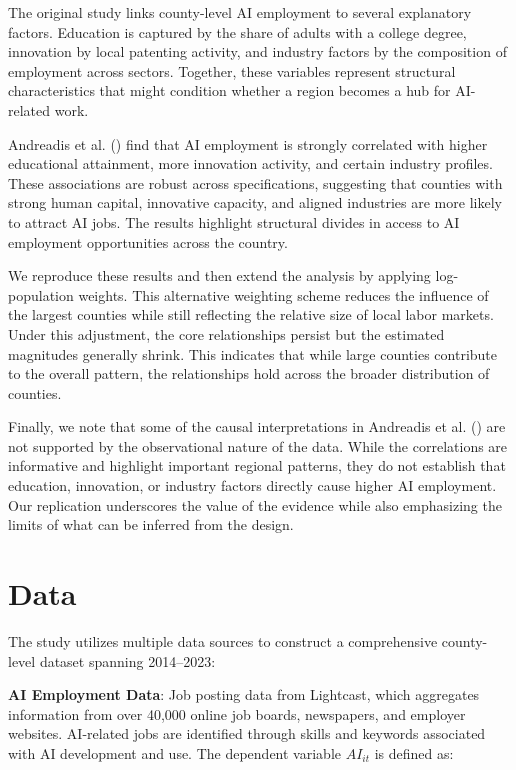\documentclass[
]{article}
\begin{document}
The original study links county-level AI employment to several
explanatory factors. Education is captured by the share of adults with a
college degree, innovation by local patenting activity, and industry
factors by the composition of employment across sectors. Together, these
variables represent structural characteristics that might condition
whether a region becomes a hub for AI-related work.

Andreadis et al. () find that AI
employment is strongly correlated with higher educational attainment,
more innovation activity, and certain industry profiles. These
associations are robust across specifications, suggesting that counties
with strong human capital, innovative capacity, and aligned industries
are more likely to attract AI jobs. The results highlight structural
divides in access to AI employment opportunities across the country.

We reproduce these results and then extend the analysis by applying
log-population weights. This alternative weighting scheme reduces the
influence of the largest counties while still reflecting the relative
size of local labor markets. Under this adjustment, the core
relationships persist but the estimated magnitudes generally shrink.
This indicates that while large counties contribute to the overall
pattern, the relationships hold across the broader distribution of
counties.

Finally, we note that some of the causal interpretations in Andreadis et
al. () are not supported by the
observational nature of the data. While the correlations are informative
and highlight important regional patterns, they do not establish that
education, innovation, or industry factors directly cause higher AI
employment. Our replication underscores the value of the evidence while
also emphasizing the limits of what can be inferred from the design.

\section{Data}\label{data}

The study utilizes multiple data sources to construct a comprehensive
county-level dataset spanning 2014--2023:

\textbf{AI Employment Data}: Job posting data from Lightcast, which
aggregates information from over 40,000 online job boards, newspapers,
and employer websites. AI-related jobs are identified through skills and
keywords associated with AI development and use. The dependent variable
\(AI_{it}\) is defined as:
\end{document}
